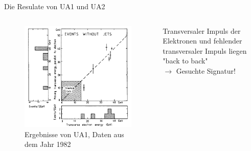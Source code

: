 \documentclass[aspectratio=1610, professionalfonts, 10pt]{beamer}
\begin{document}
\begin{frame}[plain]{Die Resulate von UA1 und UA2}
		\vspace*{-40px}
	\begin{columns}
			\begin{figure}
	  			\centering
				\includegraphics[width=0.95\textheight]{Images/Screenshot_2018-12-04_18-22-25.png}
				\caption{Ergebnisse von UA1, Daten aus dem Jahr 1982 \cite{doi:10.1142/9789814644150_0006}}
	  			\label{fig:sad}
			\end{figure}
				Transversaler Impuls der Elektronen und fehlender transversaler Impuls liegen "back to back" \\
				$\rightarrow$ Gesuchte Signatur!
	\end{columns}
\end{frame}
\end{document}
